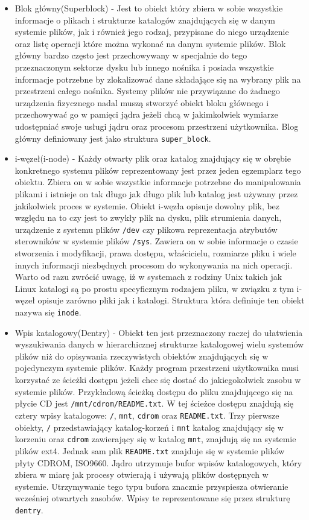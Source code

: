 \documentclass[10pt]{article}
\begin{document}
\begin{itemize}
\item
  Blok główny(Superblock) - Jest to obiekt który zbiera w sobie wszystkie informacje o plikach i strukturze katalogów znajdujących się w danym systemie plików, jak i również jego rodzaj, przypisane do niego urządzenie oraz listę operacji które można wykonać na danym systemie plików. Blok główny bardzo często jest przechowywany w specjalnie do tego przeznaczonym sektorze dysku lub innego nośnika i posiada wszystkie informacje potrzebne by zlokalizować dane składające się na wybrany plik na przestrzeni całego nośnika. Systemy plików nie przywiązane do żadnego urządzenia fizycznego nadal muszą stworzyć obiekt bloku głównego i przechowywać go w pamięci jądra jeżeli chcą w jakimkolwiek wymiarze udostępniać swoje usługi jądru oraz procesom przestrzeni użytkownika. Blog główny definiowany jest jako struktura \texttt{super\_block}.
\item
  i-węzeł(i-node) - Każdy otwarty plik oraz katalog znajdujący się w obrębie konkretnego systemu plików reprezentowany jest przez jeden egzemplarz tego obiektu. Zbiera on w sobie wszystkie informacje potrzebne do manipulowania plikami i istnieje on tak długo jak długo plik lub katalog jest używany przez jakikolwiek proces w systemie.  Obiekt i-węzła opisuje dowolny plik, bez względu na to czy jest to zwykły plik na dysku, plik strumienia danych, urządzenie z systemu plików \texttt{/dev} czy plikowa reprezentacja atrybutów sterowników w systemie plików \texttt{/sys}. Zawiera on w sobie informacje o czasie stworzenia i modyfikacji, prawa dostępu, właścicielu, rozmiarze pliku i wiele innych informacji niezbędnych procesom do wykonywania na nich operacji. Warto od razu zwrócić uwagę, iż w systemach z rodziny Unix takich jak Linux katalogi są po prostu specyficznym rodzajem pliku, w związku z tym i-węzeł opisuje zarówno pliki jak i katalogi. Struktura która definiuje ten obiekt nazywa się \texttt{inode}.
\item
  Wpis katalogowy(Dentry) - Obiekt ten jest przeznaczony raczej do ułatwienia wyszukiwania danych w hierarchicznej strukturze katalogowej wielu systemów plików niż do opisywania rzeczywistych obiektów znajdujących się w pojedynczym systemie plików. Każdy program przestrzeni użytkownika musi korzystać ze ścieżki dostępu jeżeli chce się dostać do jakiegokolwiek zasobu w systemie plików. Przykładową ścieżką dostępu do pliku znajdującego się na płycie CD jest \texttt{/mnt/cdrom/README.txt}. W tej ścieżce dostępu znajdują się cztery wpisy katalogowe: \texttt{/}, \texttt{mnt}, \texttt{cdrom} oraz \texttt{README.txt}. Trzy pierwsze obiekty, \texttt{/} przedstawiający katalog-korzeń i \texttt{mnt} katalog znajdujący się w korzeniu oraz \texttt{cdrom} zawierający się w katalog \texttt{mnt}, znajdują się na systemie plików ext4. Jednak sam plik \texttt{README.txt} znajduje się w systemie plików płyty CDROM, ISO9660. Jądro utrzymuje bufor wpisów katalogowych, który zbiera w miarę jak procesy otwierają i używają plików dostępnych w systemie. Utrzymywanie tego typu bufora znacznie przyspiesza otwieranie wcześniej otwartych zasobów. Wpisy te reprezentowane się przez strukturę \texttt{dentry}.

\end{itemize}
\end{document}
